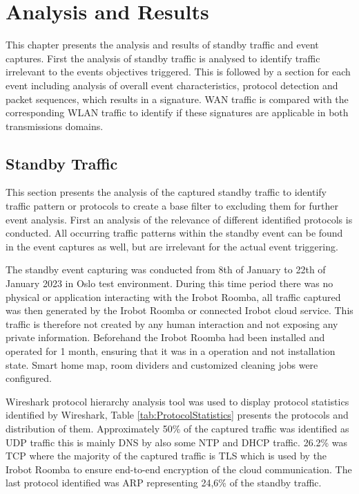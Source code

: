 \chapter{Analysis and Results}
\label{cap:AnalysisandResults1}

This chapter presents the analysis and results of standby traffic and event captures. First the analysis of standby traffic is analysed to identify traffic irrelevant to the events objectives triggered. This is followed by a section for each event including analysis of overall event characteristics, protocol detection and packet sequences, which results in a signature. WAN traffic is compared with the corresponding WLAN traffic to identify if these signatures are applicable in both transmissions domains. 

\section{Standby Traffic}
This section presents the analysis of the captured standby traffic to identify traffic pattern  or protocols to create a base filter to excluding them for further event analysis. First an analysis of the relevance of different identified protocols is conducted. All occurring traffic patterns within the standby event can be found in the event captures as well, but are irrelevant for the actual event triggering.

The standby event capturing was conducted from 8th of January to 22th of January 2023 in Oslo test environment. During this time period there was no physical or application interacting with the Irobot Roomba, all traffic captured was then generated by the Irobot Roomba or connected Irobot cloud service. This traffic is therefore not created by any human interaction and not exposing any private information. Beforehand the Irobot Roomba had been installed and operated for 1 month, ensuring that it was in a operation and not installation state. Smart home map, room dividers and customized  cleaning jobs were configured. 

Wireshark protocol hierarchy analysis tool was used to display protocol statistics identified by Wireshark, Table \ref{tab:ProtocolStatistics} presents the protocols and distribution of them. Approximately 50\% of the captured traffic was identified as UDP traffic this is mainly DNS by also some NTP and DHCP traffic. 26.2\% was TCP where the majority of the captured traffic is TLS which is used by the Irobot Roomba to ensure end-to-end encryption of the cloud communication. The last protocol identified was ARP representing 24,6\% of the standby traffic. 


